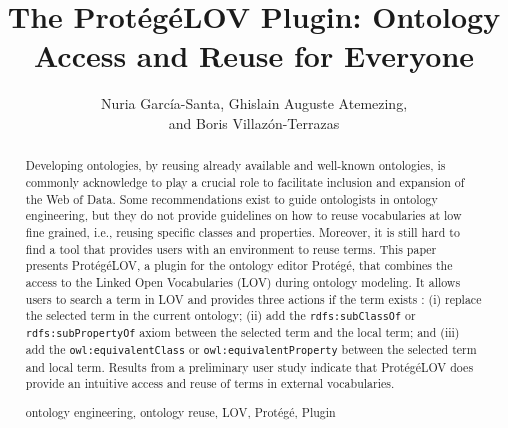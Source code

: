 \documentclass[runningheads,a4paper]{llncs}
\newcommand{\keywords}[1]{\par\addvspace\baselineskip
\noindent\keywordname\enspace\ignorespaces#1}
\begin{document}

\title{The Prot{\'e}g{\'e}LOV Plugin: Ontology Access and Reuse for Everyone }


\author{ Nuria Garc\'ia-Santa, Ghislain Auguste Atemezing,\\ and Boris Villaz{\'o}n-Terrazas}


\maketitle


\begin{abstract}
Developing ontologies, by reusing already available and well-known ontologies, is commonly acknowledge to play a crucial role to facilitate inclusion and expansion of the Web of Data. Some recommendations exist to guide ontologists in ontology engineering, but they do not provide guidelines on how to reuse vocabularies at low fine grained, i.e., reusing specific classes and properties. Moreover, it is still hard to find a tool that provides users with an environment to reuse terms. This paper presents Prot{\'e}g{\'e}LOV, a plugin for the ontology editor Prot{\'e}g{\'e}, that combines the access to the Linked Open Vocabularies (LOV) during ontology modeling. It allows users to search a term in LOV and provides three actions if the term exists : (i) replace the selected term in the current ontology; (ii) add the {\tt rdfs:subClassOf} or {\tt rdfs:subPropertyOf} axiom between the selected term and the local term; and (iii) add the {\tt owl:equivalentClass} or {\tt owl:equivalentProperty} between the selected term and local term. Results from a preliminary user study indicate that Prot{\'e}g{\'e}LOV does provide an intuitive access and reuse of terms in external vocabularies.
\keywords{ontology engineering, ontology reuse, LOV, Prot{\'e}g{\'e}, Plugin} 
\end{abstract}

\end{document}
